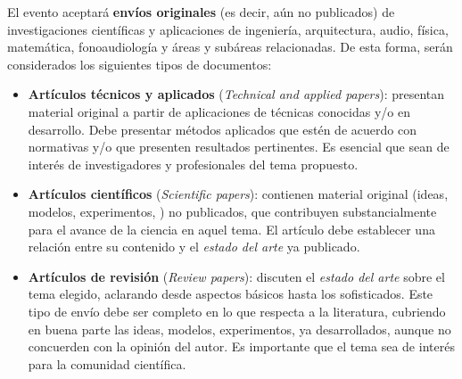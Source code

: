 \documentclass[12pt, a4paper, twoside, twocolumn]{article}
\begin{document}
El evento aceptará \textbf{envíos originales} (es decir, aún no publicados) de investigaciones científicas y aplicaciones de ingeniería, arquitectura, audio, física, matemática, fonoaudiología y áreas y subáreas relacionadas. De esta forma, serán considerados los siguientes tipos de documentos:
%
\begin{itemize}[noitemsep,topsep=2ex] \itemsep=12pt
	\item \textbf{Artículos técnicos y aplicados} (\textit{Technical and applied papers}): presentan material original a partir de aplicaciones de técnicas conocidas y/o en desarrollo. Debe presentar métodos aplicados que estén de acuerdo con normativas y/o que presenten resultados pertinentes. Es esencial que sean de interés de investigadores y profesionales del tema propuesto.
	
	\item \textbf{Artículos científicos} (\textit{Scientific papers}): 
	contienen material original (ideas, modelos, experimentos, \etc) no publicados, que contribuyen substancialmente para el avance de la ciencia en aquel tema. El artículo debe establecer una relación entre su contenido y el \textit{estado del arte} ya publicado.

	\item \textbf{Artículos de revisión} (\textit{Review papers}):
	discuten el \textit{estado del arte} sobre el tema elegido, aclarando desde aspectos básicos hasta los sofisticados. Este tipo de envío debe ser completo en lo que respecta a la literatura, cubriendo en buena parte las ideas, modelos, experimentos, \etc ya desarrollados, aunque no concuerden con la opinión del autor. Es importante que el tema sea de interés para la comunidad científica.
\end{itemize}

\vspace{5pt}
\end{document}
